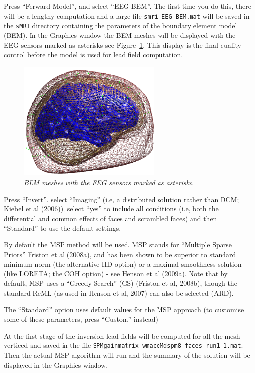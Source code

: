 Press ``Forward Model'', and select ``EEG BEM''. The first time you do this, there will be a lengthy computation and a large file \texttt{smri\_EEG\_BEM.mat} will be saved in the \texttt{sMRI} directory containing the parameters of the boundary element model (BEM). In the Graphics window the BEM meshes will be displayed with the EEG sensors marked as asterisks see Figure~\ref{multimodal:fig:2}. This display is the final quality control before the model is used for lead field computation.

\begin{figure}
\begin{center}
\includegraphics[width=70mm]{multimodal/figures/eeg_forward.png}
\caption{\em BEM meshes with the EEG sensors marked as asterisks.\label{multimodal:fig:2}}
\end{center}
\end{figure}

Press ``Invert'', select ``Imaging'' (i.e, a distributed solution rather than DCM; Kiebel et al (2006)), select ``yes'' to include all conditions (i.e, both the differential and common effects of faces and scrambled faces) and then ``Standard'' to use the default settings.

By default the MSP method will be used. MSP stands for ``Multiple Sparse Priors'' Friston et al (2008a), and has been shown to be superior to standard minimum norm (the alternative IID option) or a maximal smoothness solution (like LORETA; the COH option) - see Henson et al (2009a). Note that by default, MSP uses a ``Greedy Search'' (GS) (Friston et al, 2008b), though the standard ReML (as used in Henson et al, 2007) can also be selected (ARD).

The ``Standard'' option uses default values for the MSP approach (to customise some of these parameters, press ``Custom'' instead).

At the first stage of the inversion lead fields will be computed for all the mesh verticed and saved in the file \texttt{SPMgainmatrix\_wmaceMdspm8\_faces\_run1\_1.mat}. Then the actual MSP algorithm will run and the summary of the solution will be displayed in the Graphics window.

